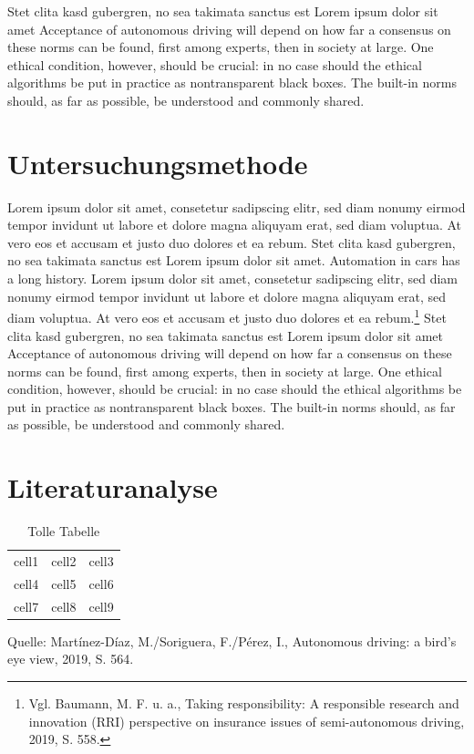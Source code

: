 Stet clita kasd gubergren, no sea takimata sanctus est Lorem ipsum dolor sit amet Acceptance of autonomous driving will depend on how far a consensus on these norms can be found, first among experts, then in society at large.
One ethical condition, however, should be crucial: in no case should the ethical algorithms be put in practice as nontransparent black boxes.
The built-in norms should, as far as possible, be understood and commonly shared.

\section{Untersuchungsmethode}

Lorem ipsum dolor sit amet, consetetur sadipscing elitr, sed diam nonumy eirmod tempor invidunt ut labore et dolore magna aliquyam erat, sed diam voluptua.
At vero eos et accusam et justo duo dolores et ea rebum.
Stet clita kasd gubergren, no sea takimata sanctus est Lorem ipsum dolor sit amet.
Automation in cars has a long history.  Lorem ipsum dolor sit amet, consetetur sadipscing elitr, sed diam nonumy eirmod tempor invidunt ut labore et dolore magna aliquyam erat, sed diam voluptua.
At vero eos et accusam et justo duo dolores et ea rebum.\footnote{Vgl. Baumann, M. F. u. a., Taking responsibility: A responsible research and innovation (RRI) perspective on insurance issues of semi-autonomous driving, 2019, S. 558.}
Stet clita kasd gubergren, no sea takimata sanctus est Lorem ipsum dolor sit amet Acceptance of autonomous driving will depend on how far a consensus on these norms can be found, first among experts, then in society at large.
One ethical condition, however, should be crucial: in no case should the ethical algorithms be put in practice as nontransparent black boxes.
The built-in norms should, as far as possible, be understood and commonly shared.


\section{Literaturanalyse}

\begin{table}[ht]
	\caption{Tolle Tabelle}
	\centering
	\begin{tabular}{ | c | c | c | }
		\hline
		cell1 & cell2 & cell3 \\
		cell4 & cell5 & cell6 \\
		cell7 & cell8 & cell9 \\
		\hline
	\end{tabular}
	\begin{flushleft}
		Quelle: Martínez-Díaz, M./Soriguera, F./Pérez, I., Autonomous driving: a bird's eye view, 2019, S. 564.
	\end{flushleft}
\end{table}

